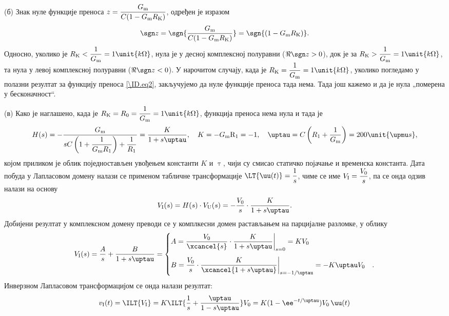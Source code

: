 (б) Знак нуле функције преноса $z = \dfrac{G_{\rm m}}{C(1 - G_{\rm m} R_{\rm K})}$, одређен је изразом
\begin{equation}
    \sgn z = \sgn {\dfrac{G_{\rm m}}{C(1 - G_{\rm m} R_{\rm K})}} = \sgn{(1 - G_{\rm m} R_{\rm K})}.
\end{equation}
Односно, уколико је $R_{\rm K} < \dfrac{1}{G_{\rm m}} = 1\unit{k\Omega}$, нула је у десној комплексној полуравни ($\Re{\sgn z} > 0$), док је 
за $R_{\rm K} > \dfrac{1}{G_{\rm m}} = 1\unit{k\Omega}$, та нула у левој комплексној полуравни ($\Re {\sgn z} < 0$). У нарочитом случају, 
када је $R_{\rm K} = \dfrac{1}{G_{\rm m}} = 1\unit{k\Omega}$, уколико погледамо у полазни резултат за функцију преноса \ref{\ID.eq2}, закључујемо да нуле функције преноса 
тада нема. Тада још кажемо и да је нула „померена у бесконачност“.

(в) Како је наглашено, када је $R_{\rm K} = R_0 = \dfrac{1}{G_{\rm m}} = 1\unit{k\Omega}$, функција преноса нема нула и тада је 
\small
\begin{equation}
    H(s) = - \dfrac{G_{\rm m} }{ sC\left(1 + \dfrac{1}{G_{\rm m} R_1}\right) + \dfrac{1}{R_1} } 
    = \dfrac{K}{1 + s\uptau}, \quad K = -G_{\rm m}{\rm R_1} = -1, \quad \uptau = C\left( R_1 + \dfrac{1}{G_{\rm m}} \right) = 200\unit{\upmu s},
\end{equation}
\normalsize
којом приликом је облик поједностављен увођењем константи $K$ и $\uptau$, чији су смисао статичко појачање и временска константа.  
Дата побуда у Лапласовом домену налази се применом табличне трансформације 
$\LT{\uu(t)} = \dfrac{1}{s}$, чиме се име $V_{\rm I} = \dfrac{V_0}{s}$, па се онда одзив налази на основу 
\begin{eqnarray}
    V_{\rm I}(s) = H(s) \cdot V_{\rm U}(s) = - \dfrac{V_{0}}{s} \cdot \dfrac{K}{1 + s\uptau}.
\end{eqnarray}
Добијени резултат у комплексном домену преводи се у комплкесни домен растављањем на парцијалне разломке, у облику 
\begin{eqnarray} 
    V_{\rm I}(s) = \dfrac{A}{s} + \dfrac{B}{1 + s\uptau} = 
    \begin{cases}
        A = \dfrac{V_{0}}{\xcancel{s}} \cdot  \dfrac{K}{1 + s\uptau}  \bigg|_{s = 0} = 
        K V_0 & \\[5mm]
        B =  
        \dfrac{V_{0}}{s} \cdot  \dfrac{K}{\xcancel{1 + s\uptau}}  \bigg|_{s = -1/\uptau} = -K \uptau V_0
        &.
    \end{cases}
\end{eqnarray}
Инверзном Лапласовом трансформацијом се онда налази резултат: 
\begin{equation}
    v_{\rm I}(t) = \ILT{V_{\rm I}} = K \ILT{ \dfrac{1}{s} + \dfrac{\uptau}{1 - s\uptau} } V_0 = 
    {K}(1 - \ee^{-t/\uptau} ) V_0 \, \uu(t)
\end{equation}

